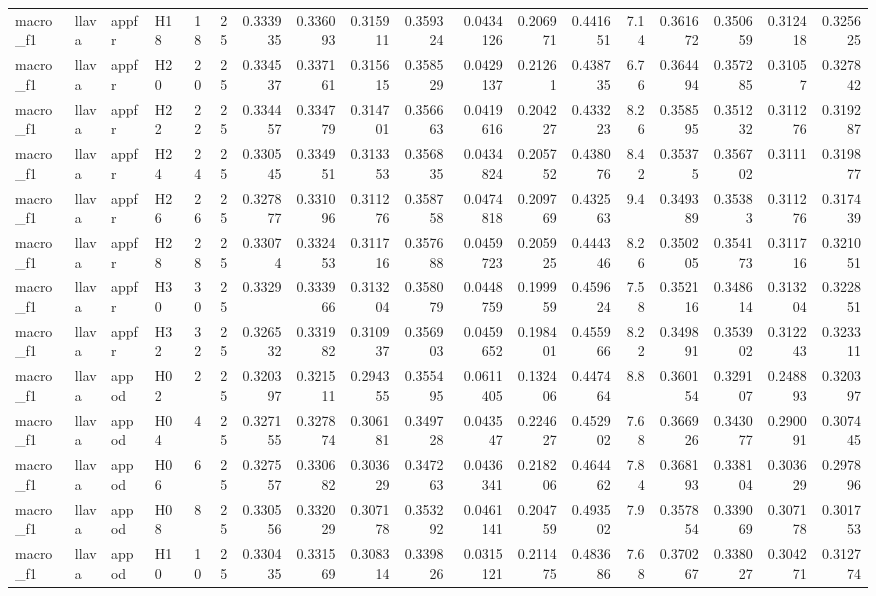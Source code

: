\begin{longtable}{llllrrrrrrrrrrrrrr}
macro\_f1 & llava & appfr & H18 & 18 & 25 & 0.333935 & 0.336093 & 0.315911 & 0.359324 & 0.0434126 & 0.206971 & 0.441651 & 7.14 & 0.361672 & 0.350659 & 0.312418 & 0.325625 \\
macro\_f1 & llava & appfr & H20 & 20 & 25 & 0.334537 & 0.337161 & 0.315615 & 0.358529 & 0.0429137 & 0.21261 & 0.438735 & 6.76 & 0.364494 & 0.357285 & 0.31057 & 0.327842 \\
macro\_f1 & llava & appfr & H22 & 22 & 25 & 0.334457 & 0.334779 & 0.314701 & 0.356663 & 0.0419616 & 0.204227 & 0.433223 & 8.26 & 0.358595 & 0.351232 & 0.311276 & 0.319287 \\
macro\_f1 & llava & appfr & H24 & 24 & 25 & 0.330545 & 0.334951 & 0.313353 & 0.356835 & 0.0434824 & 0.205752 & 0.438076 & 8.42 & 0.35375 & 0.356702 & 0.3111 & 0.319877 \\
macro\_f1 & llava & appfr & H26 & 26 & 25 & 0.327877 & 0.331096 & 0.311276 & 0.358758 & 0.0474818 & 0.209769 & 0.432563 & 9.4 & 0.349389 & 0.35383 & 0.311276 & 0.317439 \\
macro\_f1 & llava & appfr & H28 & 28 & 25 & 0.33074 & 0.332453 & 0.311716 & 0.357688 & 0.0459723 & 0.205925 & 0.444346 & 8.26 & 0.350205 & 0.354173 & 0.311716 & 0.321051 \\
macro\_f1 & llava & appfr & H30 & 30 & 25 & 0.3329 & 0.333966 & 0.313204 & 0.358079 & 0.0448759 & 0.199959 & 0.459624 & 7.58 & 0.352116 & 0.348614 & 0.313204 & 0.322851 \\
macro\_f1 & llava & appfr & H32 & 32 & 25 & 0.326532 & 0.331982 & 0.310937 & 0.356903 & 0.0459652 & 0.198401 & 0.455966 & 8.22 & 0.349891 & 0.353902 & 0.312243 & 0.323311 \\
macro\_f1 & llava & appod & H02 & 2 & 25 & 0.320397 & 0.321511 & 0.294355 & 0.355495 & 0.0611405 & 0.132406 & 0.447464 & 8.8 & 0.360154 & 0.329107 & 0.248893 & 0.320397 \\
macro\_f1 & llava & appod & H04 & 4 & 25 & 0.327155 & 0.327874 & 0.306181 & 0.349728 & 0.043547 & 0.224627 & 0.452902 & 7.68 & 0.366926 & 0.343077 & 0.290091 & 0.307445 \\
macro\_f1 & llava & appod & H06 & 6 & 25 & 0.327557 & 0.330682 & 0.303629 & 0.347263 & 0.0436341 & 0.218206 & 0.464462 & 7.84 & 0.368193 & 0.338104 & 0.303629 & 0.297896 \\
macro\_f1 & llava & appod & H08 & 8 & 25 & 0.330556 & 0.332029 & 0.307178 & 0.353292 & 0.0461141 & 0.204759 & 0.493502 & 7.9 & 0.357854 & 0.339069 & 0.307178 & 0.301753 \\
macro\_f1 & llava & appod & H10 & 10 & 25 & 0.330435 & 0.331569 & 0.308314 & 0.339826 & 0.0315121 & 0.211475 & 0.483686 & 7.68 & 0.370267 & 0.338027 & 0.304271 & 0.312774 \\

\end{longtable}
